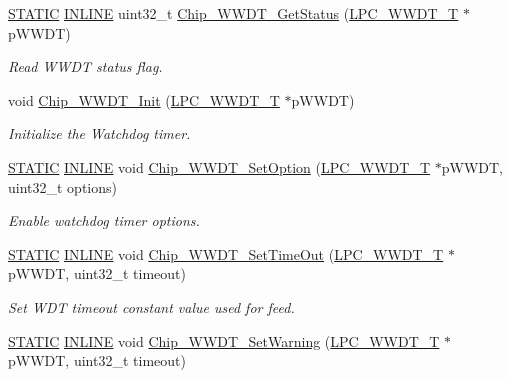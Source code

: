 \begin{DoxyCompactItemize}
\hyperlink{group__LPC__Types__Public__Macros_ga10b2d890d871e1489bb02b7e70d9bdfb}{S\+T\+A\+T\+IC} \hyperlink{group__LPC__Types__Public__Types_ga2eb6f9e0395b47b8d5e3eeae4fe0c116}{I\+N\+L\+I\+NE} uint32\+\_\+t \hyperlink{group__WWDT__17XX__40XX_ga9e5a34151326049c5485bb20c9f36fee}{Chip\+\_\+\+W\+W\+D\+T\+\_\+\+Get\+Status} (\hyperlink{structLPC__WWDT__T}{L\+P\+C\+\_\+\+W\+W\+D\+T\+\_\+T} $\ast$p\+W\+W\+DT)
\begin{DoxyCompactList}\small\item\em Read W\+W\+DT status flag. \end{DoxyCompactList}\item 
void \hyperlink{group__WWDT__17XX__40XX_gab4cdf632b42394855a6b8cf969f49693}{Chip\+\_\+\+W\+W\+D\+T\+\_\+\+Init} (\hyperlink{structLPC__WWDT__T}{L\+P\+C\+\_\+\+W\+W\+D\+T\+\_\+T} $\ast$p\+W\+W\+DT)
\begin{DoxyCompactList}\small\item\em Initialize the Watchdog timer. \end{DoxyCompactList}\item 
\hyperlink{group__LPC__Types__Public__Macros_ga10b2d890d871e1489bb02b7e70d9bdfb}{S\+T\+A\+T\+IC} \hyperlink{group__LPC__Types__Public__Types_ga2eb6f9e0395b47b8d5e3eeae4fe0c116}{I\+N\+L\+I\+NE} void \hyperlink{group__WWDT__17XX__40XX_gab1908a91ca65434f14402e4a8373091f}{Chip\+\_\+\+W\+W\+D\+T\+\_\+\+Set\+Option} (\hyperlink{structLPC__WWDT__T}{L\+P\+C\+\_\+\+W\+W\+D\+T\+\_\+T} $\ast$p\+W\+W\+DT, uint32\+\_\+t options)
\begin{DoxyCompactList}\small\item\em Enable watchdog timer options. \end{DoxyCompactList}\item 
\hyperlink{group__LPC__Types__Public__Macros_ga10b2d890d871e1489bb02b7e70d9bdfb}{S\+T\+A\+T\+IC} \hyperlink{group__LPC__Types__Public__Types_ga2eb6f9e0395b47b8d5e3eeae4fe0c116}{I\+N\+L\+I\+NE} void \hyperlink{group__WWDT__17XX__40XX_ga3147a15042f4276588c83e98b0a1b996}{Chip\+\_\+\+W\+W\+D\+T\+\_\+\+Set\+Time\+Out} (\hyperlink{structLPC__WWDT__T}{L\+P\+C\+\_\+\+W\+W\+D\+T\+\_\+T} $\ast$p\+W\+W\+DT, uint32\+\_\+t timeout)
\begin{DoxyCompactList}\small\item\em Set W\+DT timeout constant value used for feed. \end{DoxyCompactList}\item 
\hyperlink{group__LPC__Types__Public__Macros_ga10b2d890d871e1489bb02b7e70d9bdfb}{S\+T\+A\+T\+IC} \hyperlink{group__LPC__Types__Public__Types_ga2eb6f9e0395b47b8d5e3eeae4fe0c116}{I\+N\+L\+I\+NE} void \hyperlink{group__WWDT__17XX__40XX_ga83ecb3bc2ce68b3deb8343a7d76e3d7e}{Chip\+\_\+\+W\+W\+D\+T\+\_\+\+Set\+Warning} (\hyperlink{structLPC__WWDT__T}{L\+P\+C\+\_\+\+W\+W\+D\+T\+\_\+T} $\ast$p\+W\+W\+DT, uint32\+\_\+t timeout)

\end{DoxyCompactItemize}

